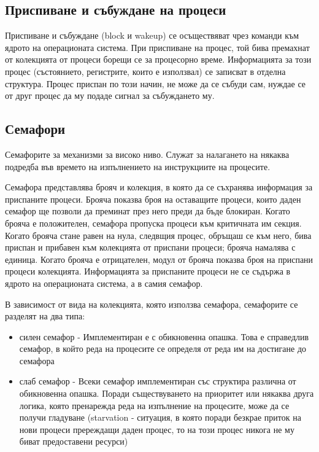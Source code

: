 \documentclass[fleqn,12pt]{article}
\begin{document}
    
\subsection{Приспиване и събуждане на процеси}
    Приспиване и събуждане (block и wakeup) се осъществяват чрез команди към ядрото на операционата система. При приспиване на процес, той бива премахнат от колекцията от процеси борещи се за процесорно време. Информацията за този процес (състоянието, регистрите, които е използвал) се записват в отделна структура. Процес приспан по този начин, не може да се събуди сам, нуждае се от друг процес да му подаде сигнал за събуждането му.


\subsection{Семафори}
    Семафорите за механизми за високо ниво. Служат за налагането на някаква подредба във времето на изпълнението на инструкциите на процесите.

    Семафора представлява брояч и колекция, в която да се съхранява информация за приспаните процеси. Брояча показва броя на оставащите процеси, които даден семафор ще позволи да преминат през него преди да бъде блокиран. Когато брояча е положителен, семафора пропуска процеси към критичната им секция. Когато брояча стане равен на нула, следвщия процес, обръщаш се към него, бива приспан и прибавен към колекцията от приспани процеси; брояча намалява с единица. Когато брояча е отрицателен, модул от брояча показва броя на приспани процеси колекцията. Информацията за приспаните процеси не се съдържа в ядрото на операционата система, а в самия семафор.

    В зависимост от вида на колекцията, която използва семафора, семафорите се разделят на два типа:

\begin{itemize}
    \item силен семафор - Имплементиран е с обикновенна опашка. Това е справедлив семафор, в който реда на процесите се определя от реда им на достигане до семафора
    \item слаб семафор - Всеки семафор имплементиран със структира различна от обикновенна опашка. Поради съществуването на приоритет или някаква друга логика, която пренарежда реда на изпълнение на процесите, може да се получи гладуване (starvation - ситуация, в която поради безкрае приток на нови процеси пререждащи даден процес, то на този процес никога не му биват предоставени ресурси)
\end{itemize}
    
\end{document}
